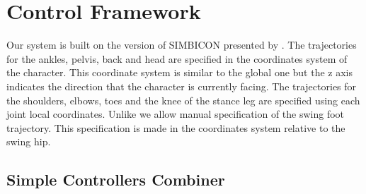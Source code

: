\documentclass[conference]{acmsiggraph}
\begin{document}
\section{Control Framework}
\label{sec:control_framework}

Our system is built on the version of SIMBICON presented by \cite{coros2010generalized}. The trajectories for the ankles, pelvis, back and head are specified in the coordinates system of the character. This coordinate system is similar to the global one but the z axis indicates the direction that the character is currently facing. The trajectories for the shoulders, elbows, toes and the knee of the stance leg are specified using each joint local coordinates.
Unlike \cite{coros2010generalized} we allow manual specification of the swing foot trajectory. This specification is made in the coordinates system relative to the swing hip.

\subsection{Simple Controllers Combiner}
\label{sec:multi_state}
\end{document}
